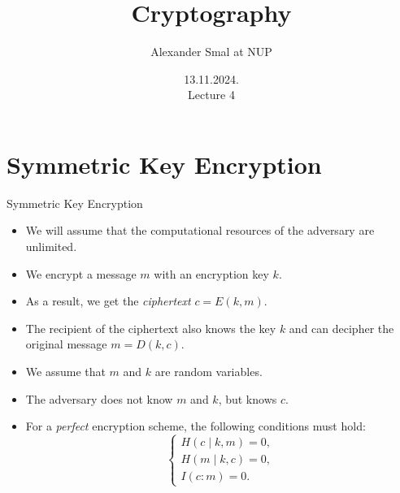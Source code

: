 \documentclass[aspectratio=169]{beamer}
\title{Cryptography}
\author{Alexander Smal at NUP}
\date{13.11.2024.\\ Lecture 4}
\newcommand{\pitem}{\pause\item}
\begin{document}
\begin{frame}[plain]
    \maketitle
\end{frame}

\section{Symmetric Key Encryption}
\begin{frame}{Symmetric Key Encryption}
    \begin{itemize}
        \item
    We will assume that the computational resources of the adversary are unlimited.

        \pitem
    We encrypt a message $m$ with an encryption key $k$.

        \pitem As a result, we get the \emph{ciphertext} $c = E(k, m)$.


        \pitem The recipient of the ciphertext also knows the key $k$ and can decipher the original message $m = D(k, c)$.

        \pitem We assume that $m$ and $k$ are random variables.

        \pitem The adversary does not know $m$ and $k$, but knows $c$.

        \pitem For a \emph{perfect} encryption scheme, the following conditions must hold:
        \[
        \begin{cases}
            H(c \mid k, m) = 0,\\
            H(m \mid k, c) = 0,\\
            I(c : m) = 0.
        \end{cases}
        \]

    \end{itemize}

\end{frame}
\end{document}
